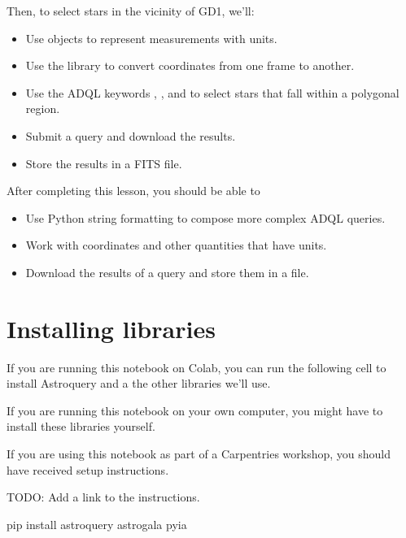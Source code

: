 \documentclass[letterpaper,10pt,english]{sphinxmanual}
\begin{document}
Then, to select stars in the vicinity of GD\sphinxhyphen{}1, we’ll:
\begin{itemize}
\item {} 
Use  objects to represent measurements with units.

\item {} 
Use the  library to convert coordinates from one frame to another.

\item {} 
Use the ADQL keywords , , and  to select stars that fall within a polygonal region.

\item {} 
Submit a query and download the results.

\item {} 
Store the results in a FITS file.

\end{itemize}

After completing this lesson, you should be able to
\begin{itemize}
\item {} 
Use Python string formatting to compose more complex ADQL queries.

\item {} 
Work with coordinates and other quantities that have units.

\item {} 
Download the results of a query and store them in a file.

\end{itemize}


\section{Installing libraries}
\label{\detokenize{02_coords:installing-libraries}}
If you are running this notebook on Colab, you can run the following cell to install Astroquery and a the other libraries we’ll use.

If you are running this notebook on your own computer, you might have to install these libraries yourself.

If you are using this notebook as part of a Carpentries workshop, you should have received setup instructions.

TODO: Add a link to the instructions.

\begin{sphinxVerbatim}[commandchars=\\\{\}]

 
    

 
    pip install astroquery astro\PYGZhy{}gala pyia
\end{sphinxVerbatim}
\end{document}
